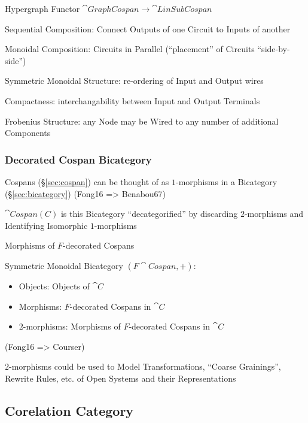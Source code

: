 Hypergraph Functor $\cat{GraphCospan} \rightarrow \cat{LinSubCospan}$

Sequential Composition: Connect Outputs of one Circuit to Inputs of
another

Monoidal Composition: Circuits in Parallel (``placement'' of Circuits
``side-by-side'')

Symmetric Monoidal Structure: re-ordering of Input and Output wires

Compactness: interchangability between Input and Output Terminals

Frobenius Structure: any Node may be Wired to any number of additional
Components



\subsubsection{Decorated Cospan Bicategory}
\label{sec:decorated_cospan_bicategory}

Cospans (\S\ref{sec:cospan}) can be thought of as $1$-morphisms in a
Bicategory (\S\ref{sec:bicategory}) (Fong16 => Benabou67)

$\cat{Cospan(C)}$ is this Bicategory ``decategorified'' by discarding
$2$-morphisms and Identifying Isomorphic $1$-morphisms

Morphisms of $F$-decorated Cospans

Symmetric Monoidal Bicategory $(F\cat{Cospan}, +)$:
\begin{itemize}
  \item Objects: Objects of $\cat{C}$
  \item Morphisms: $F$-decorated Cospans in $\cat{C}$
  \item $2$-morphisms: Morphisms of $F$-decorated Cospans in $\cat{C}$
\end{itemize}

(Fong16 => Courser)

$2$-morphisms could be used to Model Transformations, ``Coarse
Grainings'', Rewrite Rules, etc. of Open Systems and their
Representations



\subsection{Corelation Category}\label{sec:corelation_category}

